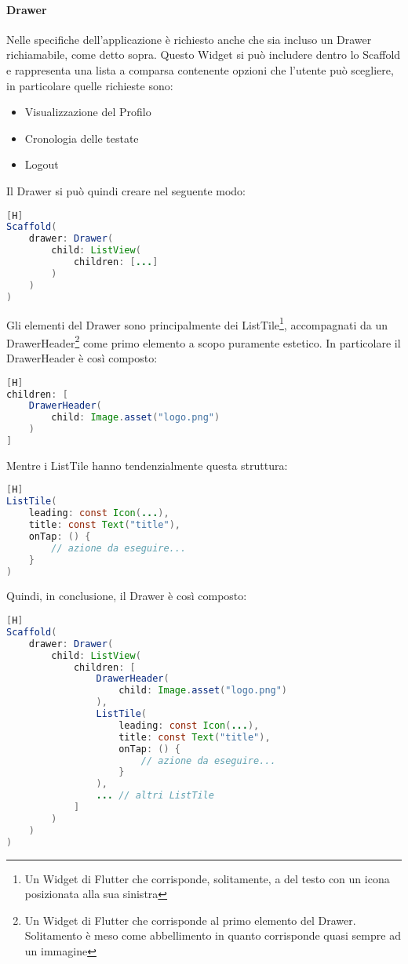 \noindent
\paragraph{Drawer}
Nelle specifiche dell'applicazione è richiesto anche che sia incluso un Drawer richiamabile, come detto sopra. Questo Widget si può includere dentro lo Scaffold e rappresenta una lista a comparsa contenente opzioni che l'utente può scegliere, in particolare quelle richieste sono:
\begin{itemize}
	\item Visualizzazione del Profilo
	\item Cronologia delle testate
	\item Logout
\end{itemize}
Il Drawer si può quindi creare nel seguente modo:
\begin{lstlisting}[language=Java, firstnumber=1][H]
Scaffold(
	drawer: Drawer(
		child: ListView(
			children: [...]
		)
	)
)
\end{lstlisting}

\noindent
Gli elementi del Drawer sono principalmente dei ListTile\footnote{Un Widget di Flutter che corrisponde, solitamente, a del testo con un icona posizionata alla sua sinistra}, accompagnati da un DrawerHeader\footnote{Un Widget di Flutter che corrisponde al primo elemento del Drawer. Solitamento è meso come abbellimento in quanto corrisponde quasi sempre ad un immagine} come primo elemento a scopo puramente estetico. In particolare il DrawerHeader è così composto:
\begin{lstlisting}[language=Java, firstnumber=50][H]
children: [
	DrawerHeader(
		child: Image.asset("logo.png")
	)
]
\end{lstlisting}

\newpage
\noindent
Mentre i ListTile hanno tendenzialmente questa struttura:
\label{cod:listile}
\begin{lstlisting}[language=Java, firstnumber=58][H]
ListTile(
	leading: const Icon(...),
	title: const Text("title"),
	onTap: () {
		// azione da eseguire...
	}
)
\end{lstlisting}

\noindent
Quindi, in conclusione, il Drawer è così composto:
\begin{lstlisting}[language=Java, firstnumber=1][H]
Scaffold(
	drawer: Drawer(
		child: ListView(
			children: [
				DrawerHeader(
					child: Image.asset("logo.png")
				),
				ListTile(
					leading: const Icon(...),
					title: const Text("title"),
					onTap: () {
						// azione da eseguire...
					}
				),
				... // altri ListTile
			]
		)
	)
)
\end{lstlisting}

